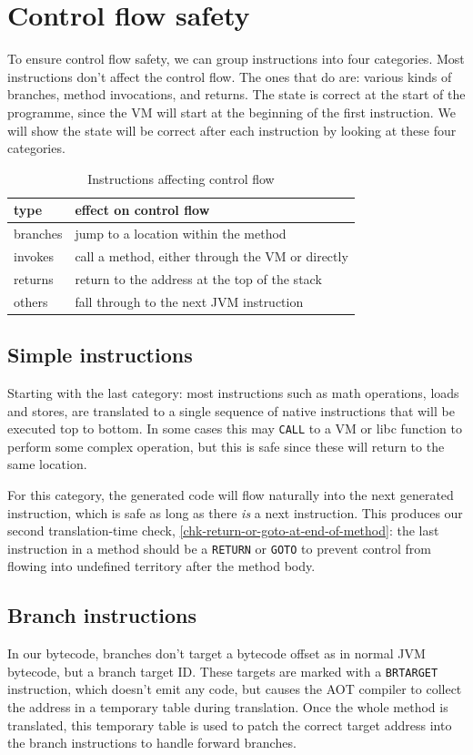 \section{Control flow safety}
To ensure control flow safety, we can group instructions into four categories. Most instructions don't affect the control flow. The ones that do are: various kinds of branches, method invocations, and returns. The state is correct at the start of the programme, since the VM will start at the beginning of the first instruction. We will show the state will be correct after each instruction by looking at these four categories.

\begin{table}[H]
\centering
\caption{Instructions affecting control flow}
\label{tbl-control-flow-instructions}
\begin{tabular}{ll}
\toprule
type     & effect on control flow \\
\midrule
branches & jump to a location within the method \\
invokes  & call a method, either through the VM or directly \\
returns  & return to the address at the top of the stack \\
others   & fall through to the next JVM instruction \\
\bottomrule
\end{tabular}
\end{table}

\subsection{Simple instructions}
Starting with the last category: most instructions such as math operations, loads and stores, are translated to a single sequence of native instructions that will be executed top to bottom. In some cases this may \texttt{CALL} to a VM or libc function to perform some complex operation, but this is safe since these will return to the same location.

For this category, the generated code will flow naturally into the next generated instruction, which is safe as long as there \emph{is} a next instruction. This produces our second translation-time check, \ref{chk-return-or-goto-at-end-of-method}: the last instruction in a method should be a \texttt{RETURN} or \texttt{GOTO} to prevent control from flowing into undefined territory after the method body.

\subsection{Branch instructions}
In our bytecode, branches don't target a bytecode offset as in normal JVM bytecode, but a branch target ID. These targets are marked with a \texttt{BRTARGET} instruction, which doesn't emit any code, but causes the AOT compiler to collect the address in a temporary table during translation. Once the whole method is translated, this temporary table is used to patch the correct target address into the branch instructions to handle forward branches.


